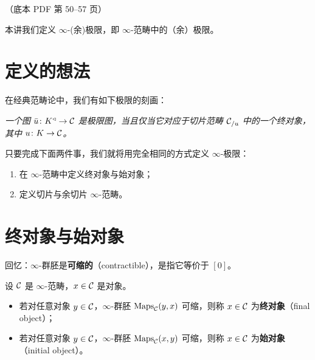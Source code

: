 \begin{center}\small\color{black!55}（底本 PDF 第 50–57 页）\end{center}

本讲我们定义 $\infty$-(余)极限，即 $\infty$-范畴中的（余）极限。

\section{定义的想法}

\nitem\label{L6-1.1} 在经典范畴论中，我们有如下极限的刻画：
\begin{center}
\emph{一个图 $\bar u\colon K^{\triangleleft}\to\mathcal{C}$ 是极限图，当且仅当它对应于切片范畴 $\mathcal{C}_{/u}$ 中的一个终对象，其中 $u\colon K\to\mathcal{C}$。}
\end{center}
只要完成下面两件事，我们就将用完全相同的方式定义 $\infty$-极限：
\begin{enumerate}[label=(\arabic*),leftmargin=2.4em,itemsep=0.1em]
\item 在 $\infty$-范畴中定义终对象与始对象；
\item 定义切片与余切片 $\infty$-范畴。
\end{enumerate}

\section{终对象与始对象}

\nitem\label{L6-2.1} 回忆：$\infty$-群胚是\textbf{可缩的}（contractible），是指它等价于 $[0]$。

\begin{definition}\label{L6-2.2}
设 $\mathcal{C}$ 是 $\infty$-范畴，$x\in\mathcal{C}$ 是对象。
\begin{itemize}[leftmargin=2.2em,itemsep=0.1em]
\item 若对任意对象 $y\in\mathcal{C}$，$\infty$-群胚 $\operatorname{Maps}_{\mathcal{C}}(y,x)$ 可缩，则称 $x\in\mathcal{C}$ 为\textbf{终对象}（final object）；
\item 若对任意对象 $y\in\mathcal{C}$，$\infty$-群胚 $\operatorname{Maps}_{\mathcal{C}}(x,y)$ 可缩，则称 $x\in\mathcal{C}$ 为\textbf{始对象}（initial object）。
\end{itemize}
\end{definition}


